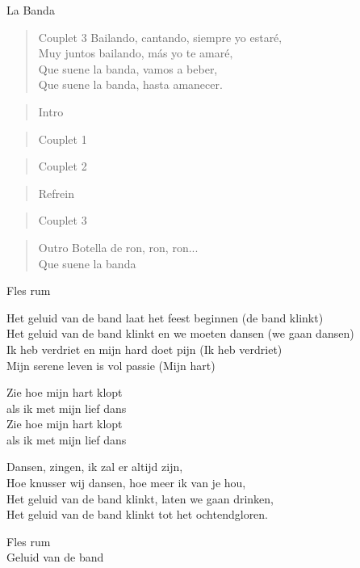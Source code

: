 \begin{song}[takirari]{La Banda}
\begin{verse}{Couplet 3}
Bailando, cantando, siempre yo estaré‚\\
Muy juntos bailando, más yo te amaré‚\\
Que suene la banda, vamos a beber,\\
Que suene la banda, hasta amanecer. \chord{$\downarrow\downarrow\downarrow\downarrow$}\\
\end{verse}

\begin{verse}{Intro}
\end{verse}
\begin{verse}{Couplet 1}
\end{verse}
\begin{verse}{Couplet 2}
\end{verse}
\begin{verse}{Refrein}
\end{verse}
\begin{verse}{Couplet 3}
\end{verse}
\begin{verse}{Outro}
Botella de ron, ron, ron...\\
Que suene la banda
\end{verse}

\end{song}

\clearpage
\begin{translation}
Fles rum\vspace{\wlskip}

Het geluid van de band laat het feest beginnen (de band klinkt)\\
Het geluid van de band klinkt en we moeten dansen (we gaan dansen)\\
Ik heb verdriet en mijn hard doet pijn (Ik heb verdriet)\\
Mijn serene leven is vol passie (Mijn hart)\vspace{\wlskip}

Zie hoe mijn hart klopt\\
als ik met mijn lief dans\\
Zie hoe mijn hart klopt\\
als ik met mijn lief dans\vspace{\wlskip}

Dansen, zingen, ik zal er altijd zijn,\\
Hoe knusser wij dansen, hoe meer ik van je hou,\\
Het geluid van de band klinkt, laten we gaan drinken,\\
Het geluid van de band klinkt tot het ochtendgloren.\vspace{\wlskip}

Fles rum\\
Geluid van de band
\end{translation}
